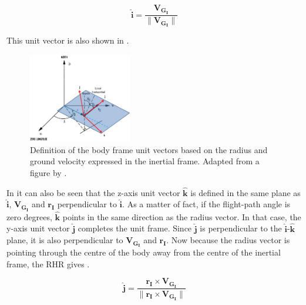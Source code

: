 \begin{equation} \label{eq:iHat}
\mathbf{\hat{i}} = \dfrac{\mathbf{V_{G_{I}}}}{\| \mathbf{V_{G_{I}}}\|}
\end{equation}


\noindent
This unit vector is also shown in .

 \begin{figure}[H]
\centering
\includegraphics[width=0.4\textwidth]{figures/reference_frames/cartesian_transformation_mooij1994motion.jpg}
\caption{Definition of the body frame unit vectors based on the radius and ground velocity expressed in the inertial frame. Adapted from a figure by  \cite{mooij1994motion}.}
\label{fig:cartesian_transformation_mooij1994motion}
\end{figure}

\noindent
In  it can also be seen that the z-axis unit vector $\mathbf{\hat{k}}$ is defined in the same plane as $\mathbf{\hat{i}}$, $\mathbf{V_{G_{I}}}$ and $\mathbf{r_{I}}$ perpendicular to $\mathbf{\hat{i}}$. As a matter of fact, if the flight-path angle is zero degrees, $\mathbf{\hat{k}}$ points in the same direction as the radius vector. In that case, the y-axis unit vector $\mathbf{\hat{j}}$ completes the unit frame. Since $\mathbf{\hat{j}}$ is perpendicular to the $\mathbf{\hat{i}}$-$\mathbf{\hat{k}}$ plane, it is also perpendicular to $\mathbf{V_{G_{I}}}$ and $\mathbf{r_{I}}$. Now because the radius vector is pointing through the centre of the body away from the centre of the inertial frame, the \ac{RHR} gives .


\begin{equation} \label{eq:jHat}
\mathbf{\hat{j}} = \dfrac{\mathbf{r_{I} \times \mathbf{V_{G_{I}}}}}{\| \mathbf{r_{I} \times \mathbf{V_{G_{I}}}} \|}
\end{equation}

